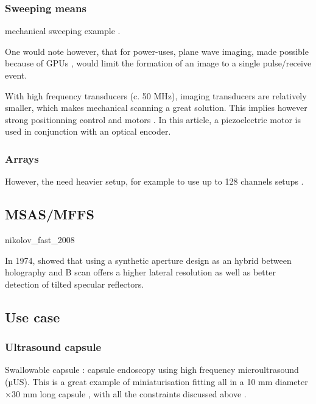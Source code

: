 \documentclass[conference]{IEEEtran}
\begin{document}
\subsubsection{Sweeping means}


mechanical sweeping example \cite{svilainis_electronics_2014}.


One would note however, that for power-uses, plane wave imaging, made possible because of GPUs \cite{hewener_mobile_2015}, would limit the formation of an image to a single pulse/receive event.


With high frequency transducers (c. 50 MHz), imaging transducers are relatively smaller, which makes mechanical scanning a great solution. This implies however strong positionning control and motors \cite{carotenuto_very_2004}. In this article, a piezoelectric	 motor is used in conjunction with an optical encoder. 


\subsubsection{Arrays}


However, the need heavier setup, for example to use up to 128 channels setups \cite{assef_flexible_2015}.




\subsection{MSAS/MFFS}

\cite{ylitalo_ultrasound_1994}

\cite{heuvel_development_2017}

nikolov_fast_2008


In 1974, \cite{burckhardt_experimental_1974} showed that using a synthetic aperture design as an hybrid  between holography and B scan offers a higher lateral resolution as well as better detection of tilted specular reflectors.

\subsection{Use case}

\subsubsection{Ultrasound capsule}

Swallowable capsule : capsule endoscopy using  high frequency microultrasound (µUS). This is a great example of miniaturisation fitting all in a  10 mm diameter ×30 mm long capsule , with all the constraints discussed above \cite{cox_ultrasound_2017}.
\end{document}
